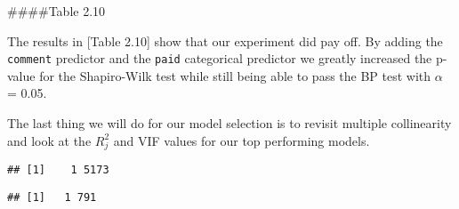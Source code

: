 \documentclass[
]{article}
\newenvironment{Shaded}{\begin{snugshade}}{\end{snugshade}}
\newcommand{\CommentTok}[1]{\textcolor[rgb]{0.56,0.35,0.01}{\textit{#1}}}
\newcommand{\DataTypeTok}[1]{\textcolor[rgb]{0.13,0.29,0.53}{#1}}
\newcommand{\DecValTok}[1]{\textcolor[rgb]{0.00,0.00,0.81}{#1}}
\newcommand{\KeywordTok}[1]{\textcolor[rgb]{0.13,0.29,0.53}{\textbf{#1}}}
\newcommand{\NormalTok}[1]{#1}
\newcommand{\OperatorTok}[1]{\textcolor[rgb]{0.81,0.36,0.00}{\textbf{#1}}}
\newcommand{\StringTok}[1]{\textcolor[rgb]{0.31,0.60,0.02}{#1}}
\begin{document}
\#\#\#\#Table 2.10

The results in {[}Table 2.10{]} show that our experiment did pay off. By
adding the \texttt{comment} predictor and the \texttt{paid} categorical
predictor we greatly increased the p-value for the Shapiro-Wilk test
while still being able to pass the BP test with \(\alpha\) = 0.05.

The last thing we will do for our model selection is to revisit multiple
collinearity and look at the \(R^2_j\) and VIF values for our top
performing models.

\begin{Shaded}
\end{Shaded}

\begin{verbatim}
## [1]    1 5173
\end{verbatim}

\begin{Shaded}
\end{Shaded}

\begin{verbatim}
## [1]   1 791
\end{verbatim}
\end{document}
